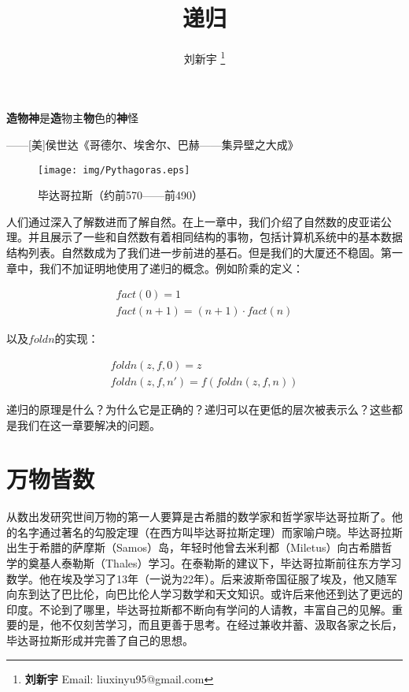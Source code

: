 \documentclass[UTF8]{article}
\begin{document}
\title{递归}

\author{刘新宇
\thanks{{\bfseries 刘新宇} \newline
  Email: liuxinyu95@gmail.com \newline}
  }

\maketitle
\fi


\epigraph{\textbf{造物神}是\textbf{造}物主\textbf{物}色的\textbf{神}怪}{——[美]侯世达《哥德尔、埃舍尔、巴赫——集异壁之大成》}

\begin{wrapfigure}{R}{0.3\textwidth}
 \centering
 \texttt{[image: img/Pythagoras.eps]}
 \captionsetup{labelformat=empty}
 \caption{毕达哥拉斯（约前570——前490）}
 \label{fig:Pythagoras}
\end{wrapfigure}

人们通过深入了解数进而了解自然。在上一章中，我们介绍了自然数的皮亚诺公理。并且展示了一些和自然数有着相同结构的事物，包括计算机系统中的基本数据结构列表。自然数成为了我们进一步前进的基石。但是我们的大厦还不稳固。第一章中，我们不加证明地使用了递归的概念。例如阶乘的定义：

\[
\begin{array}{l}
fact(0) = 1 \\
fact(n + 1) = (n + 1) \cdot fact(n)
\end{array}
\]

以及$foldn$的实现：

\[
\begin{array}{l}
foldn(z, f, 0) = z \\
foldn(z, f, n') = f(foldn(z, f, n))
\end{array}
\label{eq:foldn}
\]

递归的原理是什么？为什么它是正确的？递归可以在更低的层次被表示么？这些都是我们在这一章要解决的问题。

\section{万物皆数}

从数出发研究世间万物的第一人要算是古希腊的数学家和哲学家毕达哥拉斯了。他的名字通过著名的勾股定理（在西方叫毕达哥拉斯定理）而家喻户晓。毕达哥拉斯出生于希腊的萨摩斯（Samos）岛，年轻时他曾去米利都（Miletus）向古希腊哲学的奠基人泰勒斯（Thales）学习。在泰勒斯的建议下，毕达哥拉斯前往东方学习数学。他在埃及学习了13年（一说为22年）。后来波斯帝国征服了埃及，他又随军向东到达了巴比伦，向巴比伦人学习数学和天文知识。或许后来他还到达了更远的印度。不论到了哪里，毕达哥拉斯都不断向有学问的人请教，丰富自己的见解。重要的是，他不仅刻苦学习，而且更善于思考。在经过兼收并蓄、汲取各家之长后，毕达哥拉斯形成并完善了自己的思想\cite{HanXueTao16}。
\end{document}
